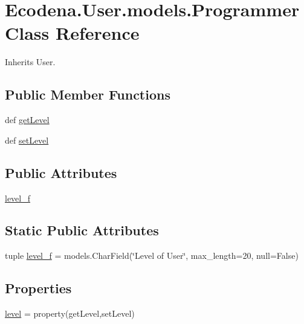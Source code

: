 \hypertarget{class_ecodena_1_1_user_1_1models_1_1_programmer}{
\section{Ecodena.User.models.Programmer Class Reference}
\label{d2/d55/class_ecodena_1_1_user_1_1models_1_1_programmer}
}


Inherits User.

\subsection*{Public Member Functions}
\begin{DoxyCompactItemize}
\item 
def \hyperlink{class_ecodena_1_1_user_1_1models_1_1_programmer_a34466582e823b65ebf0256686e9295a5}{getLevel}
\item 
def \hyperlink{class_ecodena_1_1_user_1_1models_1_1_programmer_a85cc0a80d320757784f98e793c97f07c}{setLevel}
\end{DoxyCompactItemize}
\subsection*{Public Attributes}
\begin{DoxyCompactItemize}
\item 
\hyperlink{class_ecodena_1_1_user_1_1models_1_1_programmer_a9bcbccb27a1d7d20c8f294630ec7c3f3}{level\_\-f}
\end{DoxyCompactItemize}
\subsection*{Static Public Attributes}
\begin{DoxyCompactItemize}
\item 
tuple \hyperlink{class_ecodena_1_1_user_1_1models_1_1_programmer_acac46c16e9e503624e807cefa8650a96}{level\_\-f} = models.CharField(\char`\"{}Level of User\char`\"{}, max\_\-length=20, null=False)
\end{DoxyCompactItemize}
\subsection*{Properties}
\begin{DoxyCompactItemize}
\item 
\hyperlink{class_ecodena_1_1_user_1_1models_1_1_programmer_a80f2ba5c6d6e335e9f52a22624e933bf}{level} = property(getLevel,setLevel)
\end{DoxyCompactItemize}


